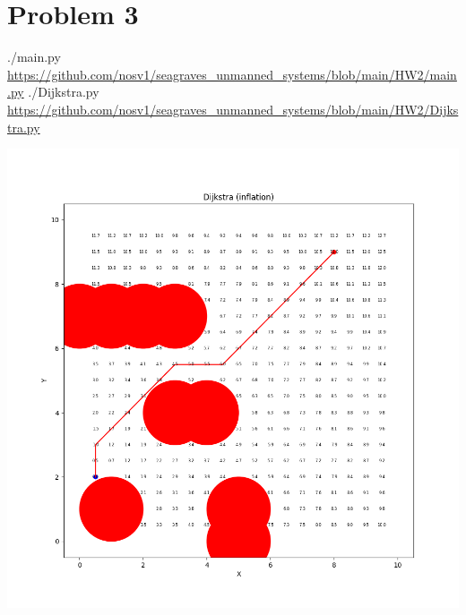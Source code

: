 \documentclass{article}
\begin{document}
        \section*{Problem 3}
            \begin{minipage}{\linewidth}
                \raggedright
                ./main.py \break
                \url{https://github.com/nosv1/seagraves_unmanned_systems/blob/main/HW2/main.py} \break
                ./Dijkstra.py \break
                \url{https://github.com/nosv1/seagraves_unmanned_systems/blob/main/HW2/Dijkstra.py}
                \begin{center}
                    \includegraphics[width=\linewidth]{HW2P3 Dijkstra inflation.png}
                \end{center}
            \end{minipage}
\end{document}
